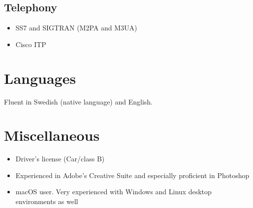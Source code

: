 \documentclass[a4paper, 11pt]{article}
\begin{document}
        \subsection*{Telephony}
            \begin{itemize}
                \item SS7 and SIGTRAN (M2PA and M3UA)
                \item Cisco ITP
            \end{itemize}

    \section*{Languages}
        Fluent in Swedish (native language) and English.

    \section*{Miscellaneous}
        \begin{itemize}
            \item Driver's license (Car/class B)
            \item Experienced in Adobe's Creative Suite and especially proficient in Photoshop
            \item macOS user. Very experienced with Windows and Linux desktop environments as well
        \end{itemize}

\end{document}
